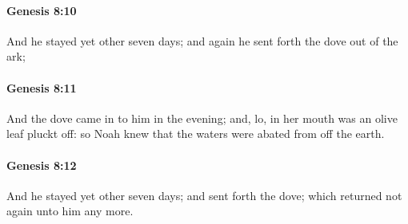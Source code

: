 		\paragraph{Genesis 8:10} %
			\label{GENESIS-8-10}

			And he stayed yet other seven days; and again he sent forth the dove out of the ark;


		\paragraph{Genesis 8:11} %
			\label{GENESIS-8-11}

			And the dove came in to him in the evening; and, lo, in her mouth was an olive leaf pluckt off: so Noah knew that the waters were abated from off the earth.


		\paragraph{Genesis 8:12} %
			\label{GENESIS-8-12}

			And he stayed yet other seven days; and sent forth the dove; which returned not again unto him any more.


